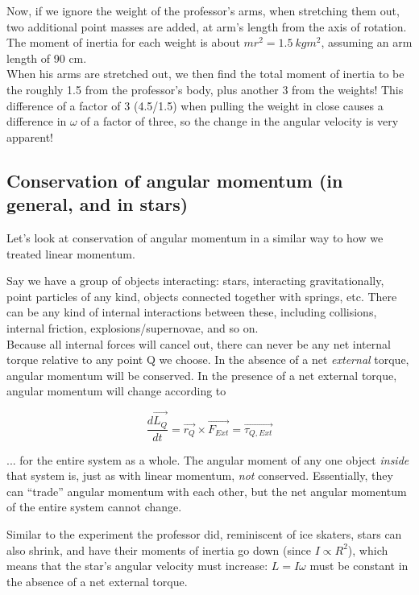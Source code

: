 Now, if we ignore the weight of the professor's arms, when stretching them out, two additional point masses are added, at arm's length from the axis of rotation. The moment of inertia for each weight is about $m r^2 = \SI{1.5}{kg m^2}$, assuming an arm length of 90 cm.\\
When his arms are stretched out, we then find the total moment of inertia to be the roughly 1.5 from the professor's body, plus another 3 from the weights! This difference of a factor of 3 (4.5/1.5) when pulling the weight in close causes a difference in $\omega$ of a factor of three, so the change in the angular velocity is very apparent!

\subsection{Conservation of angular momentum (in general, and in stars)}

Let's look at conservation of angular momentum in a similar way to how we treated linear momentum.

Say we have a group of objects interacting: stars, interacting gravitationally, point particles of any kind, objects connected together with springs, etc. There can be any kind of internal interactions between these, including collisions, internal friction, explosions/supernovae, and so on.\\
Because all internal forces will cancel out, there can never be any net internal torque relative to any point Q we choose. In the absence of a net \emph{external} torque, angular momentum will be conserved. In the presence of a net external torque, angular momentum will change according to

\begin{equation}
\frac{d\vec{L_Q}}{dt} = \vec{r_Q} \times \vec{F_{Ext}} = \vec{\tau_{Q,Ext}}
\end{equation}

... for the entire system as a whole. The angular moment of any one object \emph{inside} that system is, just as with linear momentum, \emph{not} conserved. Essentially, they can ``trade'' angular momentum with each other, but the net angular momentum of the entire system cannot change.

Similar to the experiment the professor did, reminiscent of ice skaters, stars can also shrink, and have their moments of inertia go down (since $I \propto R^2$), which means that the star's angular velocity must increase: $L = I \omega$ must be constant in the absence of a net external torque.

